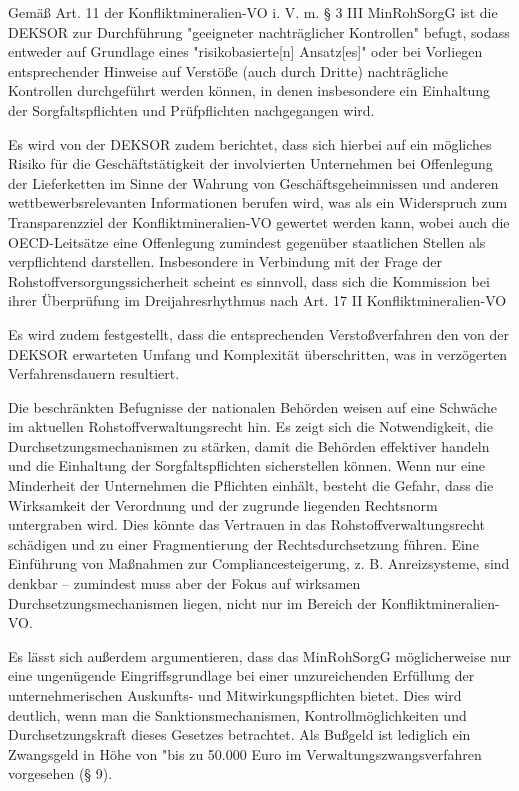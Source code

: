 \documentclass[12pt,a4paper,oneside]{book} %
\begin{document}
	Gemäß Art. 11 der Konfliktmineralien-VO i. V. m. § 3 III MinRohSorgG ist die DEKSOR zur Durchführung "geeigneter nachträglicher Kontrollen" befugt, sodass entweder auf Grundlage eines "risikobasierte[n] Ansatz[es]" oder bei Vorliegen entsprechender Hinweise auf Verstöße (auch durch Dritte) nachträgliche Kontrollen durchgeführt werden können, in denen insbesondere ein Einhaltung der Sorgfaltspflichten und Prüfpflichten nachgegangen wird.
	
	Es wird von der DEKSOR zudem berichtet, dass sich hierbei auf ein mögliches Risiko für die Geschäftstätigkeit der involvierten Unternehmen bei Offenlegung der Lieferketten im Sinne der Wahrung von Geschäftsgeheimnissen und anderen wettbewerbsrelevanten Informationen berufen wird, was als ein Widerspruch zum Transparenzziel der Konfliktmineralien-VO gewertet werden kann, wobei auch die OECD-Leitsätze eine Offenlegung zumindest gegenüber staatlichen Stellen als verpflichtend darstellen.\autocite[vgl.][37-38]{DEKSOR} Insbesondere in Verbindung mit der Frage der Rohstoffversorgungssicherheit scheint es sinnvoll, dass sich die Kommission bei ihrer Überprüfung im Dreijahresrhythmus nach Art. 17 II Konfliktmineralien-VO 
	
	Es wird zudem festgestellt, dass die entsprechenden Verstoßverfahren den von der DEKSOR erwarteten Umfang und Komplexität überschritten, was in verzögerten Verfahrensdauern resultiert. 
	
	Die beschränkten Befugnisse der nationalen Behörden weisen auf eine Schwäche im aktuellen Rohstoffverwaltungsrecht hin. Es zeigt sich die Notwendigkeit, die Durchsetzungsmechanismen zu stärken, damit die Behörden effektiver handeln und die Einhaltung der Sorgfaltspflichten sicherstellen können. Wenn nur eine Minderheit der Unternehmen die Pflichten einhält, besteht die Gefahr, dass die Wirksamkeit der Verordnung und der zugrunde liegenden Rechtsnorm untergraben wird. Dies könnte das Vertrauen in das Rohstoffverwaltungsrecht schädigen und zu einer Fragmentierung der Rechtsdurchsetzung führen. Eine Einführung von Maßnahmen zur Compliancesteigerung, z. B. Anreizsysteme, sind denkbar -- zumindest muss aber der Fokus auf wirksamen Durchsetzungsmechanismen liegen, nicht nur im Bereich der Konfliktmineralien-VO.
	
	Es lässt sich außerdem argumentieren, dass das MinRohSorgG möglicherweise nur eine ungenügende Eingriffsgrundlage bei einer unzureichenden Erfüllung der unternehmerischen Auskunfts- und Mitwirkungspflichten bietet.  Dies wird deutlich, wenn man die Sanktionsmechanismen, Kontrollmöglichkeiten und Durchsetzungskraft dieses Gesetzes betrachtet. Als Bußgeld ist lediglich ein Zwangsgeld in Höhe von "bis zu 50.000 Euro im Verwaltungszwangsverfahren vorgesehen (§ 9).
	
\end{document}
